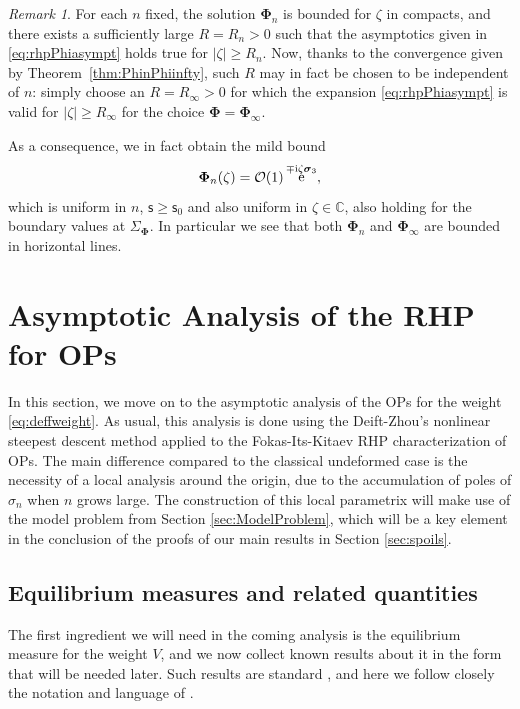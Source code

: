 \documentclass[reqno,a4paper,11pt]{amsart}
\DeclareMathOperator{\ee}{\rm e}
\newcommand{\C}{\mathbb{C}}
\newcommand{\Boh}{\mathcal{O}}
\newcommand{\ii}{\mathrm{i}}
\renewcommand{\bm}{\mathbf}
\newcommand{\msf}{\mathsf}
\renewcommand{\sp}{\boldsymbol \sigma}
\newcommand{\sad}{\msf s}
\theoremstyle{definition}
\theoremstyle{remark}
\newtheorem{remark}[theorem]{Remark}
\numberwithin{equation}{section}
\begin{document}
\begin{remark} \label{rem:bound phi_n}
    For each $n$ fixed, the solution $\bm \Phi_n$ is bounded for $\zeta$ in compacts, and there exists a sufficiently large $R=R_n>0$ such that the asymptotics given in \eqref{eq:rhpPhiasympt} holds true for $|\zeta|\geq R_n$. Now, thanks to the convergence given by Theorem~\ref{thm:PhinPhiinfty}, such $R$ may in fact be chosen to be independent of $n$: simply choose an $R=R_\infty>0$ for which the expansion \eqref{eq:rhpPhiasympt} is valid for $|\zeta|\geq R_\infty$ for the choice $\bm\Phi=\bm\Phi_\infty$.

    As a consequence, we in fact obtain the mild bound
    $$
    \bm \Phi_n(\zeta)=\Boh(1)\ee^{\mp \ii \zeta\sp_3},
    $$
    which is uniform in $n$, $\sad\geq \sad_0$ and also uniform in $\zeta\in \C$, also holding for the boundary values at $\Sigma_{\bm \Phi}$. In particular we see that both $\bm \Phi_n$ and $\bm \Phi_{\infty}$ are bounded in horizontal lines.
\end{remark}


\section{Asymptotic Analysis of the RHP for OPs}\label{sec:RHPAnalysis}

In this section, we move on to the asymptotic analysis of the OPs for the weight \eqref{eq:deffweight}. As usual, this analysis is done using the Deift-Zhou's nonlinear steepest descent method applied to the Fokas-Its-Kitaev RHP characterization of OPs. The main difference compared to the classical undeformed case is the necessity of a local analysis around the origin, due to the accumulation of poles of $\sigma_n$ when $n$ grows large. The construction of this local parametrix will make use of the model problem from Section \ref{sec:ModelProblem}, which will be a key element in the conclusion of the proofs of our main results in Section \ref{sec:spoils}.

\subsection{Equilibrium measures and related quantities}\label{sec:eqmeasure}\hfill

    The first ingredient we will need in the coming analysis is the equilibrium measure for the weight $V$, and we now collect known results about it in the form that will be needed later. Such results are standard \cite{Saff_book, deift_kriecherbauer_mclaughlin}, and here we follow closely the notation and language of \cite{kuijlaars_silva_s_curves}.
\end{document}
